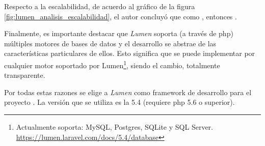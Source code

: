 
Respecto a la escalabilidad, de acuerdo al gráfico de la figura \ref{fig:lumen_analisis_escalabilidad}, el autor concluyó que como , entonces  \cite{biler2015performance}.


Finalmente, es importante destacar que \textit{Lumen} soporta (a través de \gls{php}) múltiples motores de bases de datos y el desarrollo se abstrae de las características particulares de ellos. Esto significa que se puede implementar por cualquier motor soportado por Lumen\footnote{Actualmente soporta: MySQL, Postgres, SQLite y SQL Server. \url{https://lumen.laravel.com/docs/5.4/database}}, siendo el cambio, totalmente transparente.

Por todas estas razones se elige a \textit{Lumen} como \gls{framework} de desarrollo para el proyecto \nombreApp. La versión que se utiliza es la 5.4 (requiere \gls{php} 5.6 o superior).


